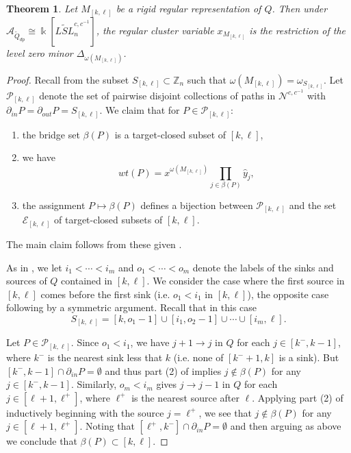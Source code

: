 \documentclass[12pt]{amsart}
\newcommand{\cA}{\mathcal{A}}
\newcommand{\ZZ}{\mathbb{Z}}
\newcommand{\kk}{\Bbbk}
\newcommand{\gv}{\omega}
\newcommand{\grep}{\gv}
\newcommand{\cE}{\mathcal{E}}
\newcommand{\cN}{\mathcal{N}} %
\newcommand{\cP}{\mathcal{P}}
\newcommand{\Qdp}{\widetilde{Q}_{dp}}
\newcommand{\Qrep}{M}
\newtheorem{theorem}{Theorem}[section]
\theoremstyle{remark}
\numberwithin{equation}{section}
\numberwithin{figure}{section}
\begin{document}
\begin{theorem}\label{th:cluster character equals minor}
  Let $\Qrep_{[k,\ell]}$ be a rigid regular representation of $Q$.
  Then under $\cA_{\Qdp} \cong \kk[\widetilde{LSL}_n^{c,c^{-1}}]$, the regular cluster variable $x_{\Qrep_{[k,\ell]}}$ is the restriction of the level zero minor $\Delta_{\grep(\Qrep_{[k,\ell]})}$.
\end{theorem}
\begin{proof}
  Recall from  the subset $S_{[k,\ell]} \subset \ZZ_n$ such that $\grep(\Qrep_{[k,\ell]}) = \omega_{S_{[k,\ell]}}$.
  Let $\cP_{[k,\ell]}$ denote the set of pairwise disjoint collections of paths in $\cN^{c,c^{-1}}$ with $\partial_{in}P = \partial_{out}P = S_{[k,\ell]}$.
  We claim that for $P \in \cP_{[k,\ell]}$: 
  \begin{enumerate}
    \item 
      the bridge set $\beta(P)$ is a target-closed subset of $[k,\ell]$, 
    \item 
      we have
      \[
        wt(P) = x^{\grep(\Qrep_{[k,\ell]})} \prod_{j \in \beta(P)} \hat{y}_j,
      \]
    \item 
      the assignment $P \mapsto \beta(P)$ defines a bijection between $\cP_{[k,\ell]}$ and the set $\cE_{[k,\ell]}$ of target-closed subsets of $[k,\ell]$.
  \end{enumerate}
  The main claim follows from these given .
  
  As in , we let $i_1 < \cdots < i_m$ and $o_1 < \cdots < o_m$ denote the labels of the sinks and sources of $Q$ contained in $[k,\ell]$.
  We consider the case where the first source in $[k,\ell]$ comes before the first sink (i.e. $o_1 < i_1$ in $[k,\ell]$), the opposite case following by a symmetric argument.
  Recall that in this case
  \[
    S_{[k,\ell]} = [k,o_1-1] \cup [i_1,o_2-1] \cup \cdots \cup [i_m,\ell].
  \]
  
  Let $P \in \cP_{[k,\ell]}$.
  Since $o_1<i_1$, we have $j+1\to j$ in $Q$ for each $j\in[k^-,k-1]$, where $k^-$ is the nearest sink less that $k$ (i.e. none of $[k^-+1,k]$ is a sink).
  But $[k^-,k-1]\cap\partial_{in}P=\emptyset$ and thus part (2) of  implies $j\notin\beta(P)$ for any $j\in[k^-,k-1]$.
  Similarly, $o_m<i_m$ gives $j\to j-1$ in $Q$ for each $j\in[\ell+1,\ell^+]$, where $\ell^+$ is the nearest source after $\ell$.
  Applying part (2) of  inductively beginning with the source $j=\ell^+$, we see that $j\notin\beta(P)$ for any $j\in[\ell+1,\ell^+]$.
  Noting that $[\ell^+,k^-]\cap\partial_{in}P=\emptyset$ and then arguing as above we conclude that $\beta(P)\subset[k,\ell]$.
  

\end{proof}
\end{document}
